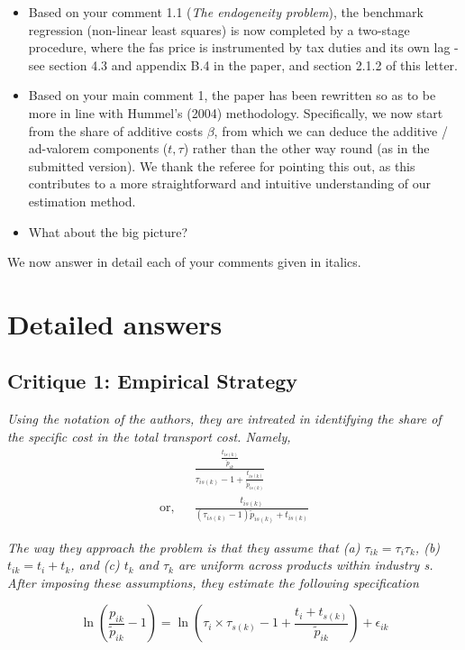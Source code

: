 \documentclass[a4paper,12pt]{article}
\begin{document}
\begin{itemize}
\item Based on your comment 1.1 (\textit{The endogeneity problem}), the benchmark regression (non-linear least squares) is now completed by a two-stage procedure, where the fas price is instrumented by tax duties and its own lag - see section 4.3 and appendix B.4 in the paper, and section 2.1.2 of this letter.

\item Based on your main comment 1, the paper has been rewritten so as to be more in line with Hummel's (2004) methodology. Specifically, we now start from the share of additive costs $\beta$, from which we can deduce the additive / ad-valorem components ($t,\tau$) rather than the other way round (as in the submitted version). We thank the referee for pointing this out, as this contributes to a more straightforward and intuitive understanding of our estimation method.

\item What about the big picture?
\end{itemize}

We now answer in detail each of your comments given in italics.

\section{Detailed answers \label{sec:detailed_answers}}


\subsection{Critique 1: Empirical Strategy}

\textit{Using the notation of the authors, they are intreated
in identifying the share of the specific cost in the total transport cost. Namely,}
\begin{eqnarray*}
&& \frac{\frac{t_{is(k)}}{\tilde{p}_{ik}}}{\tau_{is(k)}-1 + \frac{t_{is(k)}}{\tilde{p}_{is(k)}}} \\
\text{or,} &&\frac{t_{is(k)}}{(\tau_{is(k)}-1)\tilde{p}_{is(k)} + t_{is(k)}}
\end{eqnarray*}

\textit{The way they approach the problem is that they assume that (a) $\tau_{ik} = \tau_i\tau_{k}$,
(b) $t_{ik} = t_i +t_k$, and (c) $t_k$ and $\tau_k$ are uniform across products within industry
s. After imposing these assumptions, they estimate the following specification}

\begin{equation}
\ln\left(\frac{p_{ik}}{\widetilde{p}_{ik}}-1 \right)= \ln \left(\tau_{i} \times \tau_{s(k)} -1+\frac{t_{i} + t_{s(k)}}{\widetilde{p}_{ik}} \right) + \epsilon_{ik} \label{eq:equation0}
\end{equation}
\end{document}
